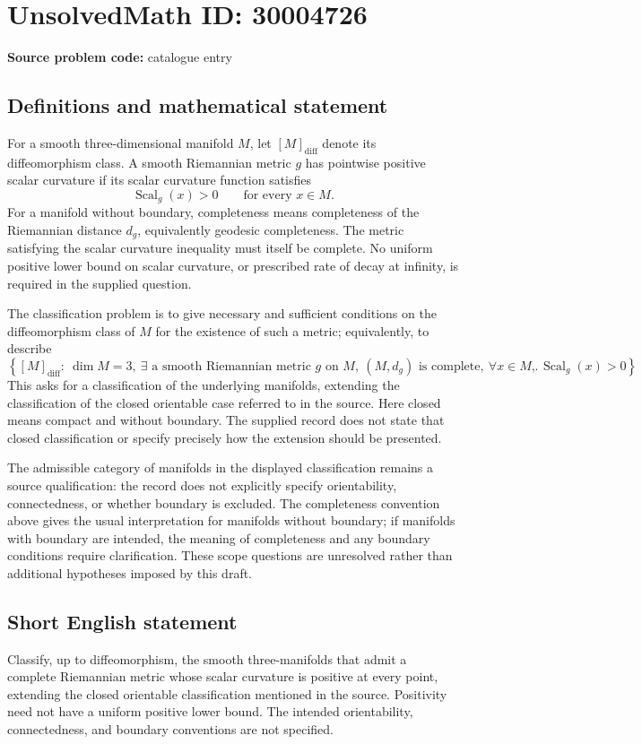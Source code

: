 \documentclass[11pt]{article}
\begin{document}
\section*{UnsolvedMath ID: 30004726}
\textbf{Source problem code:} catalogue entry
\subsection{Definitions and mathematical statement}
For a smooth three-dimensional manifold \(M\), let \([M]_{\mathrm{diff}}\) denote its diffeomorphism class. A smooth Riemannian metric \(g\) has pointwise positive scalar curvature if its scalar curvature function satisfies
\[
\operatorname{Scal}_g(x)>0\qquad\text{for every }x\in M.
\]
For a manifold without boundary, completeness means completeness of the Riemannian distance \(d_g\), equivalently geodesic completeness. The metric satisfying the scalar curvature inequality must itself be complete. No uniform positive lower bound on scalar curvature, or prescribed rate of decay at infinity, is required in the supplied question.

The classification problem is to give necessary and sufficient conditions on the diffeomorphism class of \(M\) for the existence of such a metric; equivalently, to describe
\[
\left\{[M]_{\mathrm{diff}}:\ \dim M=3,\ \exists\text{ a smooth Riemannian metric }g\text{ on }M,\ (M,d_g)\text{ is complete},\ \forall x\in M,\ \operatorname{Scal}_g(x)>0\right\}.
\]
This asks for a classification of the underlying manifolds, extending the classification of the closed orientable case referred to in the source. Here closed means compact and without boundary. The supplied record does not state that closed classification or specify precisely how the extension should be presented.

The admissible category of manifolds in the displayed classification remains a source qualification: the record does not explicitly specify orientability, connectedness, or whether boundary is excluded. The completeness convention above gives the usual interpretation for manifolds without boundary; if manifolds with boundary are intended, the meaning of completeness and any boundary conditions require clarification. These scope questions are unresolved rather than additional hypotheses imposed by this draft.
\subsection{Short English statement}
Classify, up to diffeomorphism, the smooth three-manifolds that admit a complete Riemannian metric whose scalar curvature is positive at every point, extending the closed orientable classification mentioned in the source. Positivity need not have a uniform positive lower bound. The intended orientability, connectedness, and boundary conventions are not specified.
\end{document}
